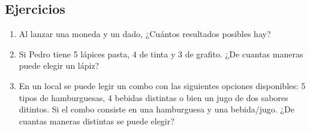 \documentclass[12pt, letterpaper]{article}
\begin{document}
    \subsection{Ejercicios}
    \begin{enumerate}
        \item Al lanzar una moneda y un dado, ¿Cuántos resultados posibles hay?
        \item Si Pedro tiene 5 lápices pasta, 4 de tinta y 3 de grafito. ¿De cuantas maneras puede elegir un lápiz?
\item En un local se puede legir un combo con las siguientes opciones disponibles: 5 tipos de hamburguesas, 4 bebidas distintas o bien un jugo de dos sabores ditintos. Si el combo consiste en una hamburguesa  y una bebida/jugo. ¿De cuantas maneras distintas se puede elegir?
    \end{enumerate}

\end{document}
